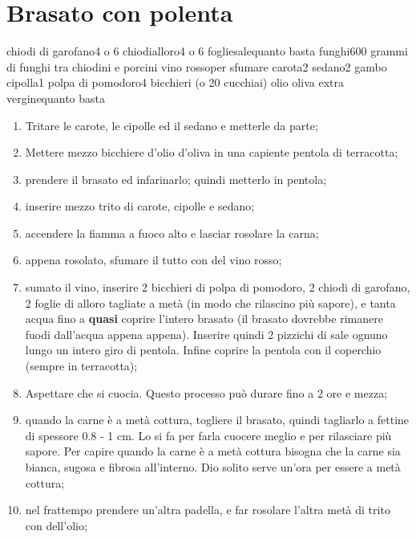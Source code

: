 \section{Brasato con polenta}

\generalRecipeInfos{}

\ingredienti%
    {chiodi di garofano}{4 o 6 chiodi}{alloro}{4 o 6 foglie}{sale}{quanto basta}%
    {funghi}{600 grammi di funghi tra chiodini e porcini}%
    {vino rosso}{per sfumare}%
    {carota}{2}%
    {sedano}{2 gambo}%
    {cipolla}{1}%
    {polpa di pomodoro}{4 bicchieri (o 20 cucchiai)}%
    {olio oliva extra vergine}{quanto basta}

\begin{enumerate}

    \item Tritare le carote, le cipolle ed il sedano e metterle da parte;
    \item Mettere  mezzo bicchiere d'olio d'oliva in una capiente pentola di terracotta;
    \item prendere il brasato ed infarinarlo; quindi metterlo in pentola;
    \item inserire mezzo trito di carote, cipolle e sedano;
    \item accendere la fiamma a fuoco alto e lasciar rosolare la carna;
    \item appena rosolato, sfumare il tutto con del vino rosso;
    \item sumato il vino, inserire 2 bicchieri di polpa di pomodoro, 2 chiodi di garofano, 2 foglie di alloro tagliate a metà (in modo che rilascino più sapore), e tanta acqua fino a \textbf{quasi} coprire l'intero brasato (il brasato dovrebbe rimanere fuodi dall'acqua appena appena). Inserire quindi 2 pizzichi di sale ognuno lungo un intero giro di pentola. Infine coprire la pentola con il coperchio (sempre in terracotta); 
    \item 
        Aspettare che si cuocia. Questo processo può durare fino a 2 ore e mezza;
    \item quando la carne è a metà cottura, togliere il brasato, quindi tagliarlo a fettine di spessore 0.8 - 1 cm. Lo si fa per farla cuocere meglio e per rilasciare più sapore. Per capire quando la carne è a metà cottura bisogna che la carne sia bianca, sugosa e fibrosa all'interno. Dio solito serve un'ora per essere a metà cottura;
    \item 
        nel frattempo prendere un'altra padella, e far rosolare l'altra metà di trito con dell'olio;

\end{enumerate}
